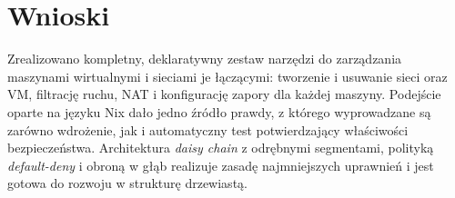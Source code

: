 \documentclass[11pt,a4paper]{article}
\begin{document}
\section{Wnioski}
Zrealizowano kompletny, deklaratywny zestaw narzędzi do zarządzania maszynami
wirtualnymi i sieciami je łączącymi: tworzenie i usuwanie sieci oraz VM,
filtrację ruchu, NAT i konfigurację zapory dla każdej maszyny. Podejście
oparte na języku Nix dało jedno źródło prawdy, z którego wyprowadzane są
zarówno wdrożenie, jak i automatyczny test potwierdzający właściwości
bezpieczeństwa. Architektura \emph{daisy chain} z odrębnymi segmentami,
polityką \emph{default-deny} i obroną w głąb realizuje zasadę najmniejszych
uprawnień i jest gotowa do rozwoju w strukturę drzewiastą.
\end{document}
